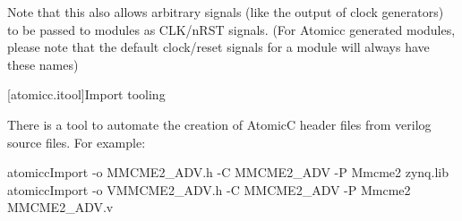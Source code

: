 Note that this also allows arbitrary signals (like the output of clock generators) to be
passed to modules as CLK/nRST signals.  (For Atomicc generated modules, please note that the
default clock/reset signals for a module will always have these names)

[atomicc.itool]{Import tooling}

There is a tool to automate the creation of AtomicC header files from verilog source files.
For example:
\begin{codeblock}
     atomiccImport -o MMCME2_ADV.h -C MMCME2_ADV -P Mmcme2 zynq.lib
     atomiccImport -o VMMCME2_ADV.h -C MMCME2_ADV -P Mmcme2 MMCME2_ADV.v
\end{codeblock}
